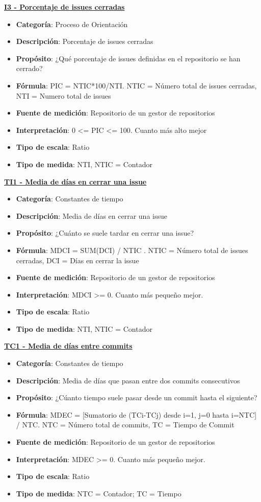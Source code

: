\textbf{\underline{I3 - Porcentaje de issues cerradas}}
\begin{itemize}
	\tightlist
	\item \textbf{Categoría}: Proceso de Orientación
	\item \textbf{Descripción}: Porcentaje de issues cerradas
	\item \textbf{Propósito}: ¿Qué porcentaje de issues definidas en el repositorio se han cerrado?
	\item \textbf{Fórmula}: PIC = NTIC*100/NTI. NTIC = Número total de issues cerradas, NTI = Numero total de issues
	\item \textbf{Fuente de medición}: Repositorio de un gestor de repositorios
	\item \textbf{Interpretación}: 0 <= PIC <= 100. Cuanto más alto mejor
	\item \textbf{Tipo de escala}: Ratio
	\item \textbf{Tipo de medida}: NTI, NTIC = Contador
\end{itemize}
\textbf{\underline{TI1 - Media de días en cerrar una issue}}
\begin{itemize}
	\tightlist
	\item \textbf{Categoría}: Constantes de tiempo
	\item \textbf{Descripción}:  Media de días en cerrar una issue
	\item \textbf{Propósito}: ¿Cuánto se suele tardar en cerrar una issue? 
	\item \textbf{Fórmula}: MDCI = SUM(DCI) / NTIC . NTIC = Número total de issues cerradas, DCI = Días en cerrar la issue
	\item \textbf{Fuente de medición}: Repositorio de un gestor de repositorios
	\item \textbf{Interpretación}: MDCI >= 0. Cuanto más pequeño mejor.
	\item \textbf{Tipo de escala}: Ratio
	\item \textbf{Tipo de medida}: NTI, NTIC = Contador
\end{itemize}
\textbf{\underline{TC1 - Media de días entre commits}}
\begin{itemize}
	\tightlist
	\item \textbf{Categoría}: Constantes de tiempo
	\item \textbf{Descripción}: Media de días que pasan entre dos commits consecutivos
	\item \textbf{Propósito}: ¿Cúanto tiempo suele pasar desde un commit hasta el siguiente?
	\item \textbf{Fórmula}: MDEC = [Sumatorio de (TCi-TCj) desde i=1, j=0 hasta i=NTC] / NTC. NTC = Número total de commits, TC = Tiempo de Commit 
	\item \textbf{Fuente de medición}: Repositorio de un gestor de repositorios
	\item \textbf{Interpretación}: MDEC >= 0. Cuanto más pequeño mejor.
	\item \textbf{Tipo de escala}: Ratio
	\item \textbf{Tipo de medida}: NTC = Contador; TC = Tiempo
\end{itemize}
